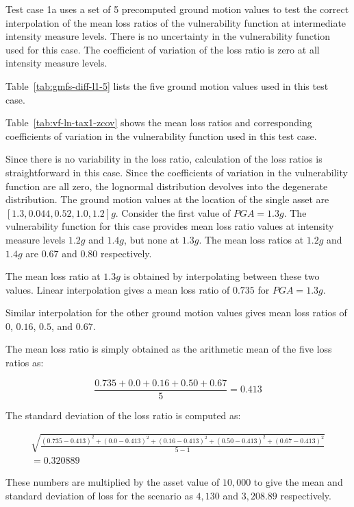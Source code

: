 Test case 1a uses a set of 5 precomputed ground motion values to test the correct interpolation of the mean loss ratios of the vulnerability function at intermediate intensity measure levels. There is no uncertainty in the vulnerability function used for this case. The coefficient of variation of the loss ratio is zero at all intensity measure levels.



Table~\ref{tab:gmfs-diff-l1-5} lists the five ground motion values used in this test case.



Table~\ref{tab:vf-ln-tax1-zcov} shows the mean loss ratios and corresponding coefficients of variation in the vulnerability function used in this test case.

Since there is no variability in the loss ratio, calculation of the loss ratios is straightforward in this case. Since the coefficients of variation in the vulnerability function are all zero, the lognormal distribution devolves into the degenerate distribution. The ground motion values at the location of the single asset are $[1.3, 0.044, 0.52, 1.0, 1.2] g$. Consider the first value of $PGA = 1.3 g$. The vulnerability function for this case provides mean loss ratio values at intensity measure levels $1.2 g$ and $1.4 g$, but none at $1.3 g$. The mean loss ratios at $1.2 g$ and $1.4 g$ are $0.67$ and $0.80$ respectively.

The mean loss ratio at $1.3 g$ is obtained by interpolating between these two values. Linear interpolation gives a mean loss ratio of $0.735$ for $PGA = 1.3 g$.

Similar interpolation for the other ground motion values gives mean loss ratios of $0$, $0.16$, $0.5$, and $0.67$.

The mean loss ratio is simply obtained as the arithmetic mean of the five loss ratios as:

\begin{equation*}
\frac{0.735 + 0.0 + 0.16 + 0.50 + 0.67}{5} = 0.413
\end{equation*}

The standard deviation of the loss ratio is computed as:

\begin{multline*}
\sqrt{\frac{(0.735 - 0.413)^2 + (0.0 - 0.413)^2 + (0.16 - 0.413)^2 + (0.50 - 0.413)^2 + (0.67 - 0.413)^2}{5 - 1}} \\
= 0.320889
\end{multline*}

These numbers are multiplied by the asset value of $10,000$ to give the mean and standard deviation of loss for the scenario as $4,130$ and $3,208.89$ respectively.